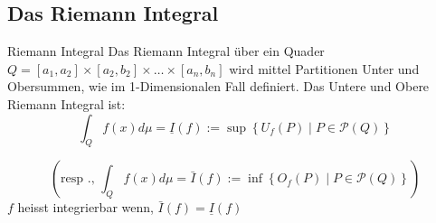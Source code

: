 \subsection{Das Riemann Integral}

\begin{Rechenregeln}{Riemann Integral}{}
    Das Riemann Integral über ein Quader $Q = [a_1,a_2] \times [a_2, b_2] \times \dots \times [a_n, b_n]$ wird mittel Partitionen Unter und Obersummen, wie im 1-Dimensionalen Fall definiert.
    Das Untere und Obere Riemann Integral ist:
    \[ 
        \int_{Q} f(x) d \mu=\underline{I}(f):=\sup \left\{U_{f}(P) \mid P \in \mathcal{P}(Q)\right\}
    \]
        
    \[
        \left(\text{resp ., } \int_{Q} f(x) d \mu=\bar{I}(f):=\inf \left\{O_{f}(P) \mid P \in \mathcal{P}(Q)\right\}\right)    
    \]
    $f$ heisst integrierbar wenn, $\bar{I}(f) = \underline{I}(f)$
\end{Rechenregeln}

